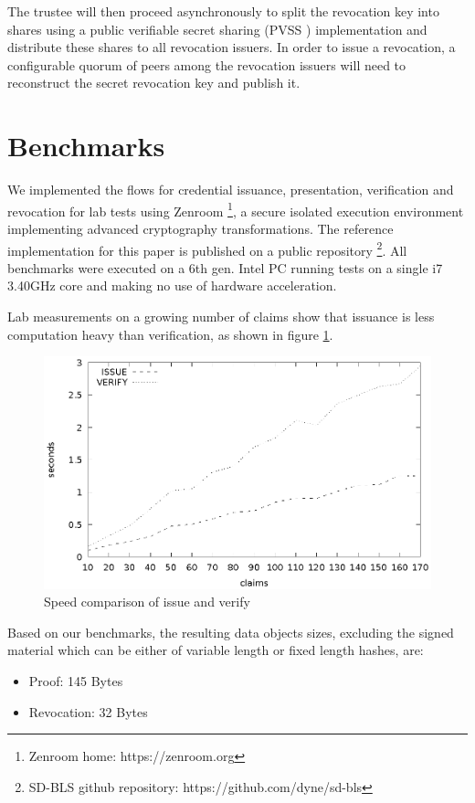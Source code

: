 The trustee will then proceed asynchronously to split the revocation key into shares using a public verifiable secret sharing (PVSS \cite{pvss}) implementation and distribute these shares to all revocation issuers. In order to issue a revocation, a configurable quorum of peers among the revocation issuers will need to reconstruct the secret revocation key and publish it.

\section{Benchmarks}

We implemented the flows for credential issuance, presentation, verification and revocation for lab tests using Zenroom \footnote{Zenroom home: https://zenroom.org}, a secure isolated execution environment implementing advanced cryptography transformations. The reference implementation for this paper is published on a public repository \footnote{SD-BLS github repository: https://github.com/dyne/sd-bls}. All benchmarks were executed on a 6th gen. Intel PC running tests on a single i7 3.40GHz core and making no use of hardware acceleration.

Lab measurements on a growing number of claims show that issuance is less computation heavy than verification, as shown in figure \ref{fig:issueproveverify}.

\begin{figure}
    \centering
    \includegraphics[width=1\linewidth]{issueproveverify.eps}

    \caption{Speed comparison of issue and verify}
    \label{fig:issueproveverify}
\end{figure}

Based on our benchmarks, the resulting data objects sizes, excluding the signed material which can be either of variable length or fixed length hashes, are:
\begin{itemize}
    \item Proof:  145 Bytes
    \item Revocation: 32 Bytes
\end{itemize}

